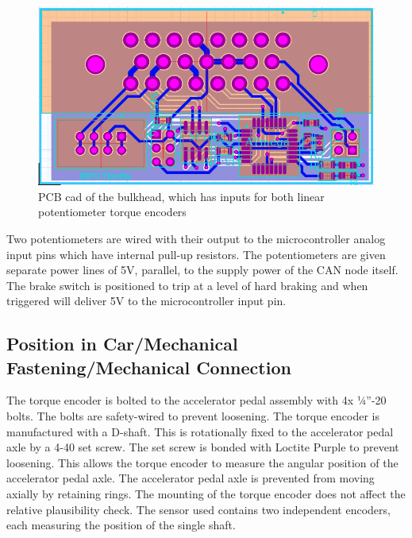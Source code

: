 \documentclass{article}
\begin{document}
        \begin{figure}[H]
            \centering
            \includegraphics[width = 0.7 \textwidth]{bulkhead}
            \caption{PCB cad of the bulkhead, which has inputs for both linear potentiometer torque encoders}
            \label{bulkheadPCB}
        \end{figure}

        Two potentiometers are wired with their output to the microcontroller analog input pins which have internal pull-up resistors. The potentiometers are given separate power lines of 5V, parallel, to the supply power of the CAN node itself. The brake switch is positioned to trip at a level of hard braking and when triggered will deliver 5V to the microcontroller input pin.

    \subsection{Position in Car/Mechanical Fastening/Mechanical Connection}


        The torque encoder is bolted to the accelerator pedal assembly with 4x ¼”-20 bolts. The bolts are safety-wired to prevent loosening. The torque encoder is manufactured with a D-shaft. This is rotationally fixed to the accelerator pedal axle by a 4-40 set screw. The set screw is bonded with Loctite Purple to prevent loosening. This allows the torque encoder to measure the angular position of the accelerator pedal axle. The accelerator pedal axle is prevented from moving axially by retaining rings. The mounting of the torque encoder does not affect the relative plausibility check. The sensor used contains two independent encoders, each measuring the position of the single shaft.
\end{document}
